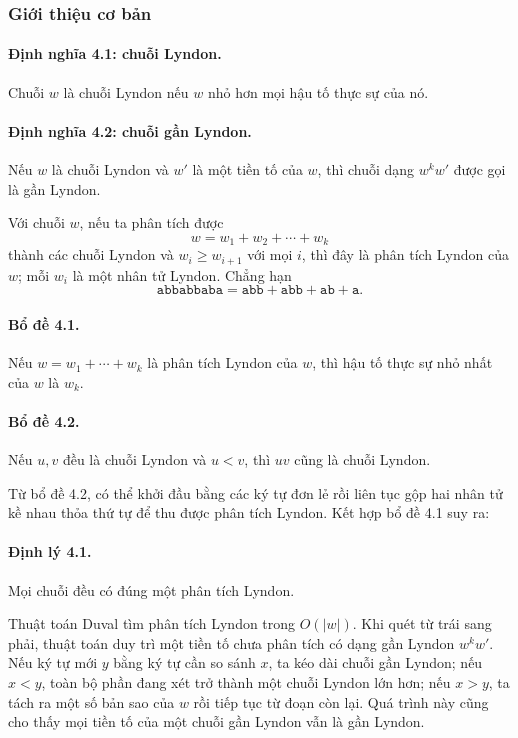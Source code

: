 \documentclass[11pt]{article}
\begin{document}
\subsubsection{Giới thiệu cơ bản}

\paragraph{Định nghĩa 4.1: chuỗi Lyndon.}
Chuỗi $w$ là chuỗi Lyndon nếu $w$ nhỏ hơn mọi hậu tố thực sự của nó.

\paragraph{Định nghĩa 4.2: chuỗi gần Lyndon.}
Nếu $w$ là chuỗi Lyndon và $w'$ là một tiền tố của $w$, thì chuỗi dạng $w^k w'$
được gọi là gần Lyndon.

Với chuỗi $w$, nếu ta phân tích được
\[
  w=w_1+w_2+\cdots+w_k
\]
thành các chuỗi Lyndon và $w_i\ge w_{i+1}$ với mọi $i$, thì đây là phân tích
Lyndon của $w$; mỗi $w_i$ là một nhân tử Lyndon. Chẳng hạn
\[
  \texttt{abbabbaba}=\texttt{abb}+\texttt{abb}+\texttt{ab}+\texttt{a}.
\]

\paragraph{Bổ đề 4.1.}
Nếu $w=w_1+\cdots+w_k$ là phân tích Lyndon của $w$, thì hậu tố thực sự nhỏ nhất
của $w$ là $w_k$.

\paragraph{Bổ đề 4.2.}
Nếu $u,v$ đều là chuỗi Lyndon và $u<v$, thì $uv$ cũng là chuỗi Lyndon.

Từ bổ đề 4.2, có thể khởi đầu bằng các ký tự đơn lẻ rồi liên tục gộp hai nhân
tử kề nhau thỏa thứ tự để thu được phân tích Lyndon. Kết hợp bổ đề 4.1 suy ra:

\paragraph{Định lý 4.1.}
Mọi chuỗi đều có đúng một phân tích Lyndon.

Thuật toán Duval tìm phân tích Lyndon trong $O(|w|)$. Khi quét từ trái sang phải,
thuật toán duy trì một tiền tố chưa phân tích có dạng gần Lyndon $w^k w'$. Nếu
ký tự mới $y$ bằng ký tự cần so sánh $x$, ta kéo dài chuỗi gần Lyndon; nếu
$x<y$, toàn bộ phần đang xét trở thành một chuỗi Lyndon lớn hơn; nếu $x>y$, ta
tách ra một số bản sao của $w$ rồi tiếp tục từ đoạn còn lại. Quá trình này cũng
cho thấy mọi tiền tố của một chuỗi gần Lyndon vẫn là gần Lyndon.
\end{document}
